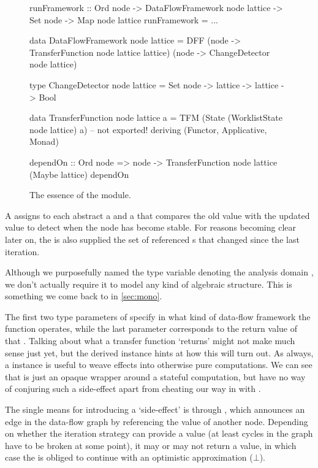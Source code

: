 \begin{figure}[h]
  \centering
  \begin{haskellcode}
    runFramework 
      :: Ord node
      -> DataFlowFramework node lattice 
      -> Set node 
      -> Map node lattice
    runFramework = ...

    data DataFlowFramework node lattice = DFF 
          (node -> TransferFunction node lattice lattice)
          (node -> ChangeDetector node lattice)

    type ChangeDetector node lattice
      = Set node -> lattice -> lattice -> Bool

    data TransferFunction node lattice a
      = TFM (State (WorklistState node lattice) a) -- not exported!
      deriving (Functor, Applicative, Monad)

    dependOn
      :: Ord node 
      => node 
      -> TransferFunction node lattice (Maybe lattice)
    dependOn
  \end{haskellcode}
  \caption{The essence of the  module.}
  \label{fig:worklist}
\end{figure}

A  assigns to each abstract  a  and a  that compares the old value with the updated value to detect when the node has become stable. 
For reasons becoming clear later on, the  is also supplied the set of referenced s that changed since the last iteration.

Although we purposefully named the type variable denoting the analysis domain , we don't actually require it to model any kind of algebraic structure.
This is something we come back to in \cref{sec:mono}.

The first two type parameters of  specify in what kind of data-flow framework the function operates, while the last parameter corresponds to the return value of that .
Talking about what a transfer function `returns' might not make much sense just yet, but the derived  instance hints at how this will turn out.
As always, a  instance is useful to weave effects into otherwise pure computations. 
We can see that  is just an opaque wrapper around a stateful computation, but have no way of conjuring such a side-effect apart from cheating our way in with .

The single means for introducing a `side-effect' is through , which announces an edge in the data-flow graph by referencing the value of another node.
Depending on whether the iteration strategy can provide a value (at least cycles in the graph have to be broken at some point), it may or may not return a value, in which case the  is obliged to continue with an optimistic approximation (\eg $\bot$).

